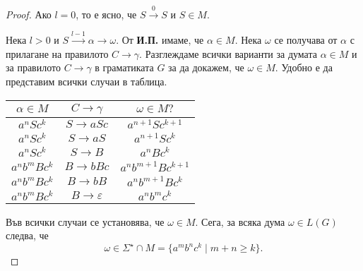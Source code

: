 \begin{proof}
  Ако $l = 0$, то е ясно, че $S \stackrel{0}{\rightarrow} S$ и $S \in M$.

  Нека $l > 0$ и $S \stackrel{l-1}{\rightarrow} \alpha \rightarrow \omega$.
  От {\bf И.П.} имаме, че $\alpha \in M$. Нека $\omega$ се получава от $\alpha$ с прилагане на правилото $C \rightarrow \gamma$.
  Разглеждаме всички варианти за думата $\alpha \in M$ и за правилото $C\rightarrow \gamma$ в граматиката $G$
  за да докажем, че  $\omega \in M$.
  Удобно е да представим всички случаи в таблица.
  \begin{center}
    \begin{tabular}{| c | c | c |}
      \hline
      $\alpha\in M$ & $C \rightarrow \gamma$ & $\omega \in M?$ \\ \hline
      $a^nSc^k$ & $S \rightarrow aSc$ & $a^{n+1}Sc^{k+1}$ \\ \hline
      $a^nSc^k$ & $S \rightarrow aS$ & $a^{n+1}Sc^{k}$ \\ \hline
      $a^nSc^k$ & $S \rightarrow B$ & $a^{n}Bc^{k}$ \\ \hline
      $a^nb^mBc^k$ & $B \rightarrow bBc$ & $a^nb^{m+1}Bc^{k+1}$\\ \hline
      $a^nb^mBc^k$ & $B \rightarrow bB$ & $a^nb^{m+1}Bc^{k}$\\ \hline
      $a^nb^mBc^k$ & $B \rightarrow \varepsilon$ & $a^nb^{m}c^{k}$\\ \hline
    \end{tabular}
  \end{center}
  Във всички случаи се установява, че $\omega \in M$.
  Сега, за всяка дума $\omega \in L(G)$ следва, че
  \[\omega \in \Sigma^\star \cap M = \{a^mb^nc^k\mid m+n \geq k\}.\]
\end{proof}


